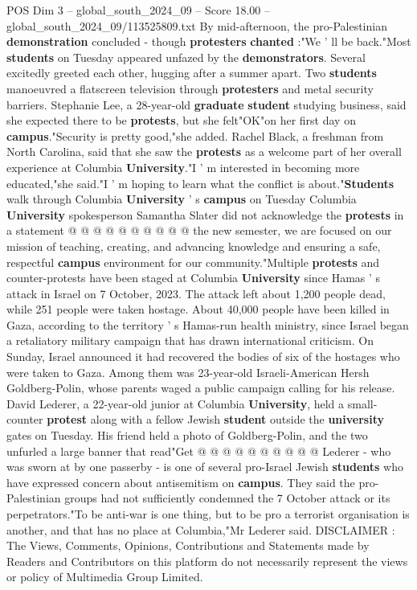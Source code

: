 \begin{textsample}{POS Dim 3 – global\_south\_2024\_09 – Score 18.00 – global\_south\_2024\_09/113525809.txt}
By mid-afternoon, the pro-Palestinian \textbf{demonstration} concluded - though \textbf{protesters} \textbf{chanted} :"We ' ll be back."Most \textbf{students} on Tuesday appeared unfazed by the \textbf{demonstrators}.
Several excitedly greeted each other, hugging after a summer apart.
Two \textbf{students} manoeuvred a flatscreen television through \textbf{protesters} and metal security barriers.
Stephanie Lee, a 28-year-old \textbf{graduate} \textbf{student} studying business, said she expected there to be \textbf{protests}, but she felt"OK"on her first day on \textbf{campus}."Security is pretty good,"she added.
Rachel Black, a freshman from North Carolina, said that she saw the \textbf{protests} as a welcome part of her overall experience at Columbia \textbf{University}."I ' m interested in becoming more educated,"she said."I ' m hoping to learn what the conflict is about."\textbf{Students} walk through Columbia \textbf{University} ' s \textbf{campus} on Tuesday Columbia \textbf{University} spokesperson Samantha Slater did not acknowledge the \textbf{protests} in a statement @ @ @ @ @ @ @ @ @ @ the new semester, we are focused on our mission of teaching, creating, and advancing knowledge and ensuring a safe, respectful \textbf{campus} environment for our community."Multiple \textbf{protests} and counter-protests have been staged at Columbia \textbf{University} since Hamas ' s attack in Israel on 7 October, 2023.
The attack left about 1,200 people dead, while 251 people were taken hostage.
About 40,000 people have been killed in Gaza, according to the territory ' s Hamas-run health ministry, since Israel began a retaliatory military campaign that has drawn international criticism.
On Sunday, Israel announced it had recovered the bodies of six of the hostages who were taken to Gaza.
Among them was 23-year-old Israeli-American Hersh Goldberg-Polin, whose parents waged a public campaign calling for his release.
David Lederer, a 22-year-old junior at Columbia \textbf{University}, held a small-counter \textbf{protest} along with a fellow Jewish \textbf{student} outside the \textbf{university} gates on Tuesday.
His friend held a photo of Goldberg-Polin, and the two unfurled a large banner that read"Get @ @ @ @ @ @ @ @ @ @ Lederer - who was sworn at by one passerby - is one of several pro-Israel Jewish \textbf{students} who have expressed concern about antisemitism on \textbf{campus}.
They said the pro-Palestinian groups had not sufficiently condemned the 7 October attack or its perpetrators."To be anti-war is one thing, but to be pro a terrorist organisation is another, and that has no place at Columbia,"Mr Lederer said.
DISCLAIMER : The Views, Comments, Opinions, Contributions and Statements made by Readers and Contributors on this platform do not necessarily represent the views or policy of Multimedia Group Limited.

\end{textsample}
